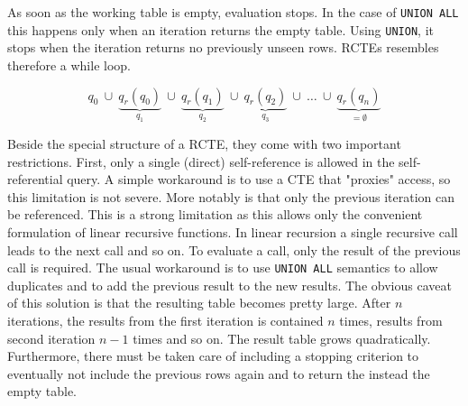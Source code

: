 As soon as the working table is empty, evaluation stops. In the case of \texttt{UNION ALL} this happens only when an iteration returns the empty table. Using \texttt{UNION}, it stops when the iteration returns no previously unseen rows. RCTEs resembles therefore a while loop.

$$
q_0 ~\cup ~\underbrace{q_r(q_0)}_{q_1} ~\cup~ \underbrace{q_r(q_1)}_{q_2}~ \cup~\underbrace{q_r(q_2)}_{q_3}~ \cup ~\hdots ~ \cup ~ \underbrace{q_r(q_n)}_{= \emptyset}
$$

Beside the special structure of a RCTE, they come with two important restrictions. First, only a single (direct) self-reference is allowed in the self-referential query. A simple workaround is to use a CTE that "proxies" access, so this limitation is not severe. More notably is that only the previous iteration can be referenced. This is a strong limitation as this allows only the convenient formulation of linear recursive functions. In linear recursion a single recursive call leads to the next call and so on. To evaluate a call, only the result of the previous call is required. The usual workaround is to use \texttt{UNION ALL} semantics to allow duplicates and to add the previous result to the new results. The obvious caveat of this solution is that the resulting table becomes pretty large. After $n$ iterations, the results from the first iteration is contained $n$ times, results from second iteration $n-1$ times and so on. The result table grows quadratically. Furthermore, there must be taken care of including a stopping criterion to eventually not include the previous rows again and to return the instead the empty table.
